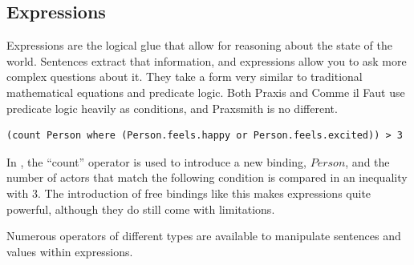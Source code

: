 \subsection{Expressions}

Expressions are the logical glue that allow for reasoning about the state of the world.
Sentences extract that information, and expressions allow you to ask more complex
questions about it. They take a form very similar to traditional mathematical equations
and predicate logic. Both Praxis \cite{evans_ai_2015} and Comme il Faut \cite{mccoy_comme_2011}
use predicate logic heavily as conditions, and Praxsmith is no different.

\begin{lstlisting}[float=hb, caption=Example expression that returns true if the number of happy or excited people is greater than 3., label=lst:Expression]
(count Person where (Person.feels.happy or Person.feels.excited)) > 3
\end{lstlisting}

In , the ``count'' operator is used to introduce a new binding, $Person$,
and the number of actors that match the following condition is compared in an inequality
with $3$. The introduction of free bindings like this makes expressions quite powerful,
although they do still come with limitations.

Numerous operators of different types are available to manipulate sentences and values
within expressions.

